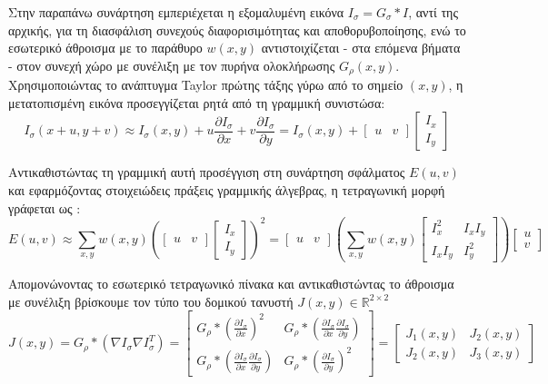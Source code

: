 \documentclass[12pt,a4paper]{article}
\begin{document}
Στην παραπάνω συνάρτηση εμπεριέχεται η εξομαλυμένη εικόνα $I_\sigma = G_\sigma * I$, αντί της αρχικής, για τη διασφάλιση συνεχούς διαφορισιμότητας και αποθορυβοποίησης, ενώ το εσωτερικό άθροισμα με το παράθυρο $w(x,y)$ αντιστοιχίζεται - στα επόμενα βήματα - στον συνεχή χώρο με συνέλιξη με τον πυρήνα ολοκλήρωσης $G_\rho(x,y)$. Χρησιμοποιώντας το ανάπτυγμα \foreignlanguage{english}{Taylor} πρώτης τάξης γύρω από το σημείο $(x, y)$, η μετατοπισμένη εικόνα προσεγγίζεται ρητά από τη γραμμική συνιστώσα:$$I_\sigma(x+u, y+v) \approx I_\sigma(x, y) + u \frac{\partial I_\sigma}{\partial x} + v \frac{\partial I_\sigma}{\partial y} = I_\sigma(x,y) + \begin{bmatrix} u & v \end{bmatrix} \begin{bmatrix} I_x \\ I_y \end{bmatrix}$$ 

Αντικαθιστώντας τη γραμμική αυτή προσέγγιση στη συνάρτηση σφάλματος $E(u,v)$ και εφαρμόζοντας στοιχειώδεις πράξεις γραμμικής άλγεβρας, η τετραγωνική μορφή γράφεται ως :$$E(u, v) \approx \sum_{x,y} w(x,y) \left( \begin{bmatrix} u & v \end{bmatrix} \begin{bmatrix} I_x \\ I_y \end{bmatrix} \right)^2 = \begin{bmatrix} u & v \end{bmatrix} \left( \sum_{x,y} w(x,y) \begin{bmatrix} I_x^2 & I_x I_y \\ I_x I_y & I_y^2 \end{bmatrix} \right) \begin{bmatrix} u \\ v \end{bmatrix}$$ 

Απομονώνοντας το εσωτερικό τετραγωνικό πίνακα και αντικαθιστώντας το άθροισμα με συνέλιξη βρίσκουμε τον τύπο του δομικού τανυστή $J(x, y) \in \mathbb{R}^{2 \times 2}$ 
$$J(x, y) = G_\rho * (\nabla I_\sigma \nabla I_\sigma^T) = \begin{bmatrix} G_\rho * (\frac{\partial I_\sigma}{\partial x})^2 & G_\rho * (\frac{\partial I_\sigma}{\partial x}\frac{\partial I_\sigma}{\partial y}) \\ G_\rho * (\frac{\partial I_\sigma}{\partial x}\frac{\partial I_\sigma}{\partial y}) & G_\rho * (\frac{\partial I_\sigma}{\partial y})^2 \end{bmatrix} = \begin{bmatrix} J_{1}(x,y) & J_{2}(x,y) \\ J_{2}(x,y) & J_{3}(x,y) \end{bmatrix}$$
\end{document}
